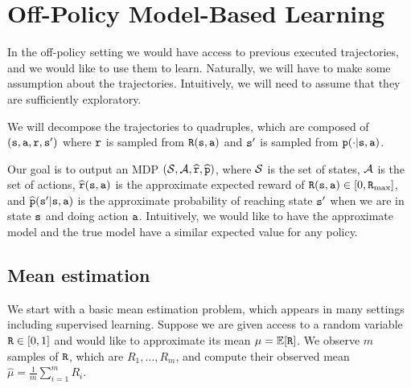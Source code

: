 \section{Off-Policy Model-Based Learning}

In the off-policy setting we would have access to previous executed
trajectories, and we would like to use them to learn. Naturally, we
will have to make some assumption about the trajectories.
Intuitively, we will need to assume that they are sufficiently
exploratory.

We will decompose the trajectories to quadruples, which are composed
of
$
({\tt s},{\tt a},{\tt r},{\tt s}')
$
where ${\tt r}$ is sampled from ${\tt R}({\tt s},{\tt a})$ and
${\tt s}'$ is sampled from ${\tt p}(\cdot|{\tt s},{\tt a})$.

Our goal is to output an MDP
$(\mathcal{S},\mathcal{A},\widehat{{\tt r}},\widehat{{\tt p}})$, where $\mathcal{S}$
is the set of states, $\mathcal{A}$ is the set of actions,
$\widehat{{\tt r}}({\tt s},{\tt a})$ is the approximate expected
reward of ${\tt R}({\tt s},{\tt a})\in[0,{\tt R}_{\max }]$, and
$\widehat{{\tt p}}({\tt s}'|{\tt s},{\tt a})$ is the approximate probability
of reaching state ${\tt s}'$ when we are in state ${\tt s}$ and doing
action ${\tt a}$. Intuitively, we would like to have the approximate
model and the true model have a similar expected value for any policy.

\subsection{Mean estimation}

We start with a basic mean estimation problem, which appears in many
settings including supervised learning.
Suppose we are given access to a random variable ${\tt R}\in[0,1]$
and would like to approximate its mean $\mu=\mathbb{E}[{\tt R}]$. We
observe $m$ samples of ${\tt R}$, which are $R_1, \ldots, R_m$, and
compute their observed mean $\widehat{\mu}=\frac{1}{m}\sum_{i=1}^m
R_i$.

